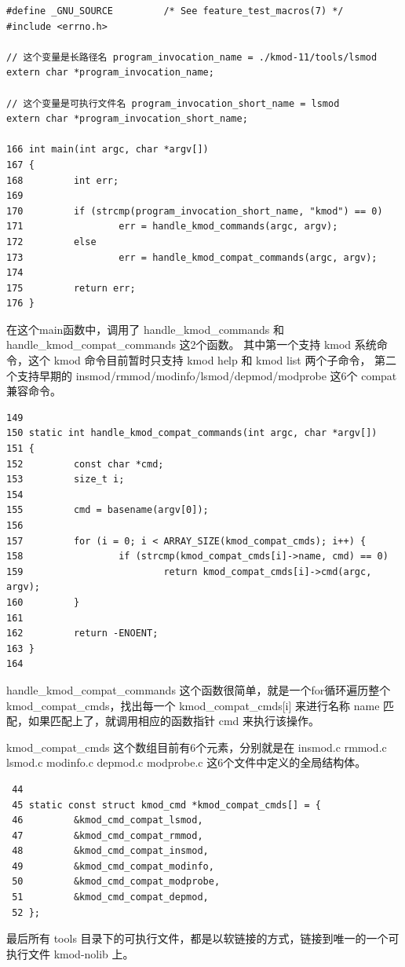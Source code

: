 \documentclass[11pt,a4paper]{article}
\begin{document}
{\begin{shaded}\begin{verbatim}
#define _GNU_SOURCE         /* See feature_test_macros(7) */
#include <errno.h>

// 这个变量是长路径名 program_invocation_name = ./kmod-11/tools/lsmod
extern char *program_invocation_name;

// 这个变量是可执行文件名 program_invocation_short_name = lsmod
extern char *program_invocation_short_name;

166 int main(int argc, char *argv[])
167 {
168         int err;
169 
170         if (strcmp(program_invocation_short_name, "kmod") == 0)
171                 err = handle_kmod_commands(argc, argv);
172         else
173                 err = handle_kmod_compat_commands(argc, argv);
174 
175         return err;
176 }
\end{verbatim}\end{shaded}}
在这个main函数中，调用了 handle\_kmod\_commands 和
handle\_kmod\_compat\_commands 这2个函数。 其中第一个支持 kmod
系统命令，这个 kmod 命令目前暂时只支持 kmod help 和 kmod list 两个子命令，
第二个支持早期的 insmod/rmmod/modinfo/lsmod/depmod/modprobe 这6个 compat
兼容命令。

{\begin{shaded}\begin{verbatim}
149 
150 static int handle_kmod_compat_commands(int argc, char *argv[])
151 {
152         const char *cmd;
153         size_t i;
154 
155         cmd = basename(argv[0]);
156 
157         for (i = 0; i < ARRAY_SIZE(kmod_compat_cmds); i++) {
158                 if (strcmp(kmod_compat_cmds[i]->name, cmd) == 0)
159                         return kmod_compat_cmds[i]->cmd(argc, argv);
160         }
161 
162         return -ENOENT;
163 }
164 
\end{verbatim}\end{shaded}}
handle\_kmod\_compat\_commands 这个函数很简单，就是一个for循环遍历整个
kmod\_compat\_cmds，找出每一个 kmod\_compat\_cmds{[}i{]} 来进行名称 name
匹配，如果匹配上了，就调用相应的函数指针 cmd 来执行该操作。

kmod\_compat\_cmds 这个数组目前有6个元素，分别就是在 insmod.c rmmod.c
lsmod.c modinfo.c depmod.c modprobe.c 这6个文件中定义的全局结构体。

{\begin{shaded}\begin{verbatim}
 44
 45 static const struct kmod_cmd *kmod_compat_cmds[] = {
 46         &kmod_cmd_compat_lsmod,
 47         &kmod_cmd_compat_rmmod,
 48         &kmod_cmd_compat_insmod,
 49         &kmod_cmd_compat_modinfo,
 50         &kmod_cmd_compat_modprobe,
 51         &kmod_cmd_compat_depmod,
 52 };
\end{verbatim}\end{shaded}}
最后所有 tools
目录下的可执行文件，都是以软链接的方式，链接到唯一的一个可执行文件
kmod-nolib 上。
\end{document}
